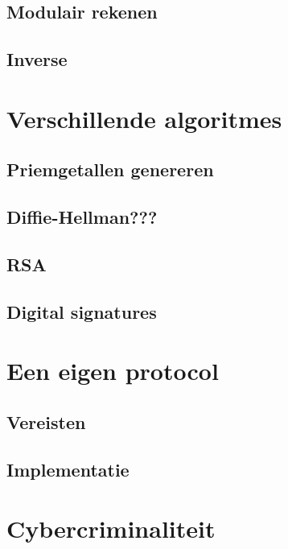\documentclass{report} %
\begin{document}
\section{Modulair rekenen}

\section{Inverse}

\chapter{Verschillende algoritmes}
\section{Priemgetallen genereren}

\section{Diffie-Hellman???}

\section{RSA}

\section{Digital signatures}

\chapter{Een eigen protocol}

\section{Vereisten}

\section{Implementatie}

\chapter{Cybercriminaliteit}
\end{document}
